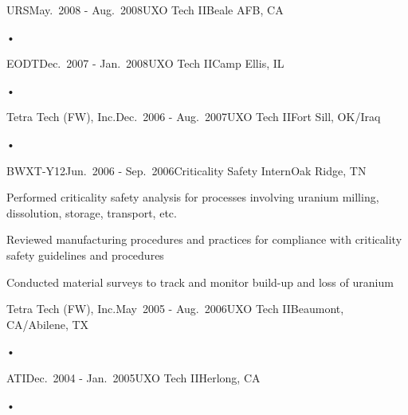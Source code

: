 
\begin{rSubsection}{URS}{May.\ 2008 - Aug.\ 2008}{UXO Tech II}{Beale AFB, CA}
\item[•]
\end{rSubsection}


\begin{rSubsection}{EODT}{Dec.\ 2007 - Jan.\ 2008}{UXO Tech II}{Camp Ellis, IL}
\item[•]
\end{rSubsection}


\begin{rSubsection}{Tetra Tech (FW), Inc.}{Dec.\ 2006 - Aug.\ 2007}{UXO Tech II}{Fort Sill, OK/Iraq}
\item[•]
\end{rSubsection}


\begin{rSubsection}{BWXT-Y12}{Jun.\ 2006 - Sep.\ 2006}{Criticality Safety Intern}{Oak Ridge, TN}
\item Performed criticality safety analysis for processes involving uranium milling, dissolution, storage, transport, etc.
\item Reviewed manufacturing procedures and practices for compliance with criticality safety guidelines and procedures
\item Conducted material surveys to track and monitor build-up and loss of uranium
\end{rSubsection}


\begin{rSubsection}{Tetra Tech (FW), Inc.}{May\ 2005 - Aug.\ 2006}{UXO Tech II}{Beaumont, CA/Abilene, TX}
\item[•]
\end{rSubsection}


\begin{rSubsection}{ATI}{Dec.\ 2004 - Jan.\ 2005}{UXO Tech II}{Herlong, CA}
\item[•]
\end{rSubsection}

